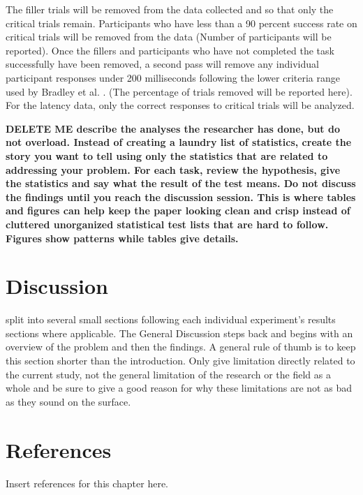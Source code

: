 The filler trials will be removed from the data collected and so that only the critical trials remain. Participants who have less than a 90 percent success rate on critical trials will be removed from the data (Number of participants will be reported). Once the fillers and participants who have not completed the task successfully have been removed, a second pass will remove any individual participant responses under 200 milliseconds following the lower criteria range used by Bradley et al. \parencite*{Bradley1993-qq}. (The percentage of trials removed will be reported here). For the latency data, only the correct responses to critical trials will be analyzed.

\textbf{DELETE ME describe the analyses the researcher has done, but do not overload. Instead of creating a laundry list of statistics, create the story you want to tell using only the statistics that are related to addressing your problem. 
For each task, review the hypothesis, give the statistics and say what the result of the test means. 
Do not discuss the findings until you reach the discussion session. 
This is where tables and figures can help keep the paper looking clean and crisp instead of cluttered unorganized statistical test lists that are hard to follow. 
Figures show patterns while tables give details.}



\section{Discussion}

split into several small sections following each individual experiment’s results sections where applicable. 
The General Discussion steps back and begins with an overview of the problem and then the findings. A general rule of thumb is to keep this section shorter than the introduction. Only give limitation directly related to the current study, not the general limitation of the research or the field as a whole and be sure to give a good reason for why these limitations are not as bad as they sound on the surface.



\section{References}

Insert references for this chapter here.